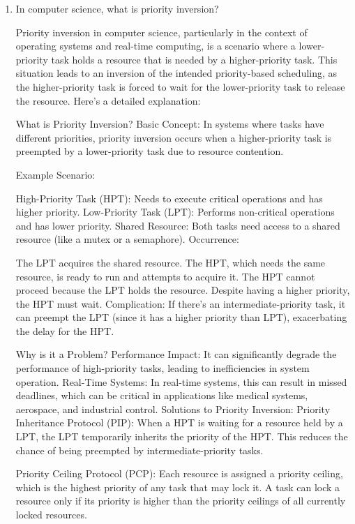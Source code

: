 \documentclass{article}
\newenvironment{QandA}{\begin{enumerate}[label=\bfseries\alph*.]\bfseries}
                      {\end{enumerate}}
\newenvironment{answered}{\par\normalfont}{}
\begin{document}
\noindent%

\begin{QandA}
   \item In computer science, what is priority inversion?
         \begin{answered}
         Priority inversion in computer science, particularly in the context of operating systems and real-time computing, is a scenario where a lower-priority task holds a resource that is needed by a higher-priority task. This situation leads to an inversion of the intended priority-based scheduling, as the higher-priority task is forced to wait for the lower-priority task to release the resource. Here's a detailed explanation:

What is Priority Inversion?
Basic Concept: In systems where tasks have different priorities, priority inversion occurs when a higher-priority task is preempted by a lower-priority task due to resource contention.

Example Scenario:

High-Priority Task (HPT): Needs to execute critical operations and has higher priority.
Low-Priority Task (LPT): Performs non-critical operations and has lower priority.
Shared Resource: Both tasks need access to a shared resource (like a mutex or a semaphore).
Occurrence:

The LPT acquires the shared resource.
The HPT, which needs the same resource, is ready to run and attempts to acquire it.
The HPT cannot proceed because the LPT holds the resource. Despite having a higher priority, the HPT must wait.
Complication: If there's an intermediate-priority task, it can preempt the LPT (since it has a higher priority than LPT), exacerbating the delay for the HPT.

Why is it a Problem?
Performance Impact: It can significantly degrade the performance of high-priority tasks, leading to inefficiencies in system operation.
Real-Time Systems: In real-time systems, this can result in missed deadlines, which can be critical in applications like medical systems, aerospace, and industrial control.
Solutions to Priority Inversion:
Priority Inheritance Protocol (PIP): When a HPT is waiting for a resource held by a LPT, the LPT temporarily inherits the priority of the HPT. This reduces the chance of being preempted by intermediate-priority tasks.

Priority Ceiling Protocol (PCP): Each resource is assigned a priority ceiling, which is the highest priority of any task that may lock it. A task can lock a resource only if its priority is higher than the priority ceilings of all currently locked resources.


\end{answered}
\end{QandA}
\end{document}
